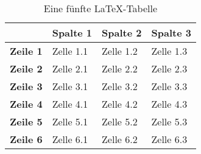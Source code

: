 
\begin{table}[h!]
\begin{center}
\begin{tabular}{p{1.5cm}|p{2.5cm}|p{2.5cm}|p{2.5cm}}
                   & \textbf{Spalte 1}              & \textbf{Spalte 2} & \textbf{Spalte 3}              \\
\hline
\textbf{Zeile 1}   & \cellcolor{gray!50}Zelle 1.1   & Zelle 1.2         & \cellcolor{gray!50}Zelle 1.3   \\
\hline
\textbf{Zeile 2}   & \cellcolor{gray!50}Zelle 2.1   & Zelle 2.2         & \cellcolor{gray!50}Zelle 2.3   \\
\hline
\textbf{Zeile 3}   & \cellcolor{gray!50}Zelle 3.1   & Zelle 3.2         & \cellcolor{gray!50}Zelle 3.3   \\
\hline
\textbf{Zeile 4}   & \cellcolor{gray!50}Zelle 4.1   & Zelle 4.2         & \cellcolor{gray!50}Zelle 4.3   \\
\hline
\textbf{Zeile 5}   & \cellcolor{gray!50}Zelle 5.1   & Zelle 5.2         & \cellcolor{gray!50}Zelle 5.3   \\
\hline
\textbf{Zeile 6}   & \cellcolor{gray!50}Zelle 6.1   & Zelle 6.2         & \cellcolor{gray!50}Zelle 6.3   \\
\end{tabular}
\caption{Eine fünfte LaTeX-Tabelle}
\end{center}
\end{table}

